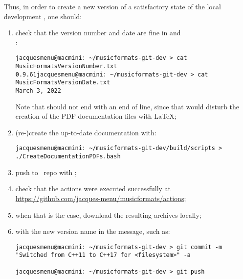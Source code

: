 Thus, in order to create a new version of a satisfactory state of the local development \repo, one should:
\begin{enumerate}
\item check that the version number and date are fine in  and \\:
\begin{lstlisting}[language=TerminalSmall]
jacquesmenu@macmini: ~/musicformats-git-dev > cat MusicFormatsVersionNumber.txt 
0.9.61jacquesmenu@macmini: ~/musicformats-git-dev > cat MusicFormatsVersionDate.txt 
March 3, 2022
\end{lstlisting}
Note that  should not end with an end of line, since that would disturb the creation of the PDF documentation files with \LaTeX;

\item (re-)create the up-to-date documentation with:
\begin{lstlisting}[language=TerminalSmall]
jacquesmenu@macmini: ~/musicformats-git-dev/build/scripts > ./CreateDocumentationPDFs.bash
\end{lstlisting}
 
\item push to \mf\ repo with ;

\item check that the actions were executed successfully at \url{https://github.com/jacques-menu/musicformats/actions};

\item when that is the case, download the resulting  archives locally;

\item {} with the new version name in the  message, such as:
\begin{lstlisting}[language=Terminal]
jacquesmenu@macmini: ~/musicformats-git-dev > git commit -m "Switched from C++11 to C++17 for <filesystem>" -a 

jacquesmenu@macmini: ~/musicformats-git-dev > git push
\end{lstlisting}


\end{enumerate}
